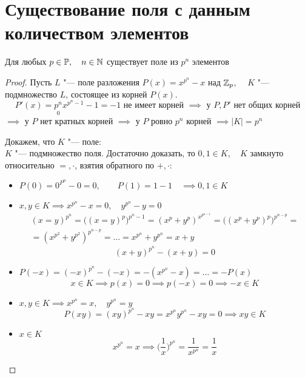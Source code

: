 \section{Существование поля с данным количеством элементов}

\begin{theorem}[сущетсвование]
	Для любых $ p \in \mathbb{P}, \quad n \in \mathbb{N} $ существует поле из $ p^n $ элементов
\end{theorem}

\begin{proof}
	Пусть $ L $ "--- поле разложения $ P(x) = x^{p^n} - x $ над $ \mathbb{Z}_p $, $ \quad K $ "--- подмножество $ L $, состоящее из корней $ P(x) $.
	$$ P'(x) = \underset0{p^n}x^{p^n - 1} - 1 = -1 \text{ не имеет корней } \implies \text{ у } P, P' \text{ нет общих корней} $$
	$ \implies $ у $ P $ нет кратных корней $ \implies $ у $ P $ ровно $ p^n $ корней $ \implies |K| = p^n $

	Докажем, что $ K $ "--- поле: \\
	$ K $ "--- подмножество поля. Достаточно доказать, то $ 0, 1 \in K, \quad K $ замкнуто относительно $ =, \cdot $, взятия обратного по $ +, \cdot $:
	\begin{itemize}
		\item $ P(0) = 0^{P^n} - 0 = 0, \qquad P(1) = 1 - 1 \quad \implies 0, 1 \in K $
		\item $ x, y \in K \implies x^{p^n} - x = 0, \quad y^{p^n} - y = 0 $
		\begin{multline*}
			(x = y)^{p^n} = \bigg( (x = y)^p \bigg)^{p^n - 1} = (x^p + y^p)^{x^{p^{n - 1}}} = \bigg( (x^p + y^p)^p \bigg)^{p^{n - p}} = \\
			= (x^{p^2} + y^{p^2})^{p^{n - p}} = \dots = x^{p^n} + y^{p^n} = x + y
		\end{multline*}
		$$ (x + y)^{p^n} - (x + y) = 0 $$
		\item $ P(-x) = (-x)^{p^n} - (-x) = -(x^{p^n} - x) = \dots = -P(x) $
		$$ x \in K \implies p(x) = 0 \implies p (-x) = 0 \implies -x \in K $$
		\item $ x, y \in K \implies x^{p^n} = x, \quad y^{p^n} = y $
		$$ P(xy) = (xy)^{p^n} - xy = x^{p^n}y^{p^n} - xy = 0 \implies xy \in K $$
		\item $ x \in K $
		$$ x^{p^n} = x \implies \bigg( \frac1x \bigg)^{p^n} = \frac1{x^{p^n}} = \frac1x $$
	\end{itemize}
\end{proof}

